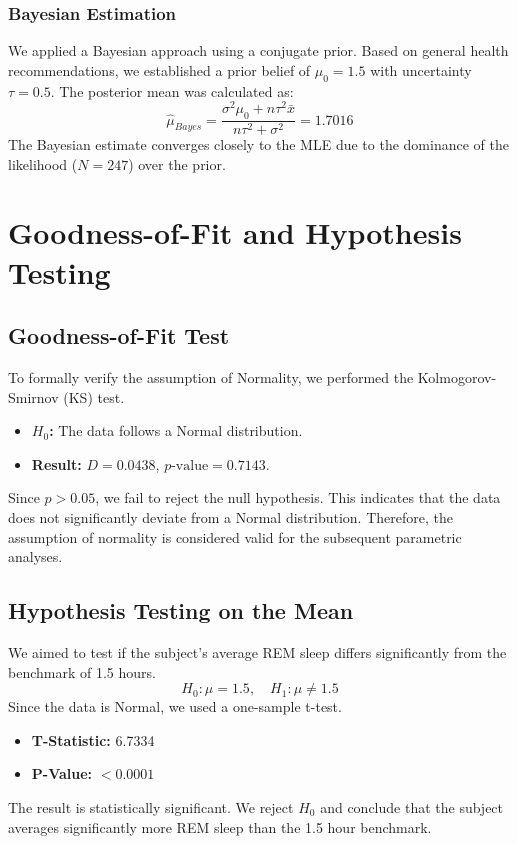 \documentclass[conference]{IEEEtran}
\begin{document}
\subsubsection{Bayesian Estimation}
We applied a Bayesian approach using a conjugate prior. Based on general health recommendations, we established a prior belief of $\mu_0 = 1.5$ with uncertainty $\tau = 0.5$. The posterior mean was calculated as:
\begin{equation}
    \hat{\mu}_{Bayes} = \frac{\sigma^2 \mu_0 + n \tau^2 \bar{x}}{n \tau^2 + \sigma^2} = 1.7016
\end{equation}
The Bayesian estimate converges closely to the MLE due to the dominance of the likelihood ($N=247$) over the prior.

\section{Goodness-of-Fit and Hypothesis Testing}

\subsection{Goodness-of-Fit Test}
To formally verify the assumption of Normality, we performed the Kolmogorov-Smirnov (KS) test.
\begin{itemize}
    \item \textbf{$H_0$:} The data follows a Normal distribution.
    \item \textbf{Result:} $D = 0.0438$, $p\text{-value} = 0.7143$.
\end{itemize}
Since $p > 0.05$, we fail to reject the null hypothesis. This indicates that the data does not significantly deviate from a Normal distribution. Therefore, the assumption of normality is considered valid for the subsequent parametric analyses.

\subsection{Hypothesis Testing on the Mean}
We aimed to test if the subject's average REM sleep differs significantly from the benchmark of 1.5 hours.
\[ H_0: \mu = 1.5, \quad H_1: \mu \neq 1.5 \]
Since the data is Normal, we used a one-sample t-test.
\begin{itemize}
    \item \textbf{T-Statistic:} 6.7334
    \item \textbf{P-Value:} $< 0.0001$
\end{itemize}
The result is statistically significant. We reject $H_0$ and conclude that the subject averages significantly more REM sleep than the 1.5 hour benchmark.
\end{document}
